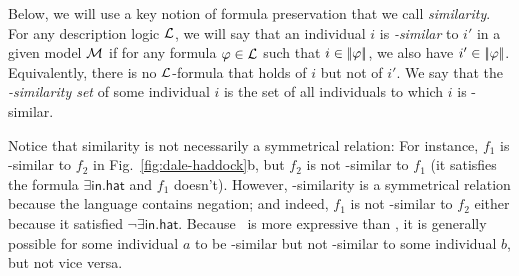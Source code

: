 Below, we will use a key notion of formula preservation that we call
\emph{similarity}.  For any description logic $\mathcal{L}$, we will say that
an individual $i$ is \emph{\gL-similar} to $i'$ in a given model $\mathcal{M}$
if for any formula $\varphi \in \mathcal{L}$ such that $i \in
|\!|\varphi|\!|$, we also have $i' \in |\!|\varphi|\!|$.
Equivalently, there is no $\mathcal{L}$-formula that holds of $i$ but not of
$i'$.  We say that the \emph{\gL-similarity set} of some individual
$i$ is the set of all individuals to which $i$ is \gL-similar.

Notice that similarity is not necessarily a symmetrical relation: For
instance, $f_1$ is \el-similar to $f_2$ in
Fig.~\ref{fig:dale-haddock}b, but $f_2$ is not \el-similar to $f_1$
(it satisfies the formula $\exists \mathsf{in}.\mathsf{hat}$ and $f_1$
doesn't).  However, \alc-similarity is a symmetrical relation because
the language contains negation; and indeed, $f_1$ is not \alc-similar
to $f_2$ either because it satisfied $\neg \exists
\mathsf{in}.\mathsf{hat}$.  Because \alc\ is more expressive than \el,
it is generally possible for some individual $a$ to be \el-similar but
not \alc-similar to some individual $b$, but not vice versa.


